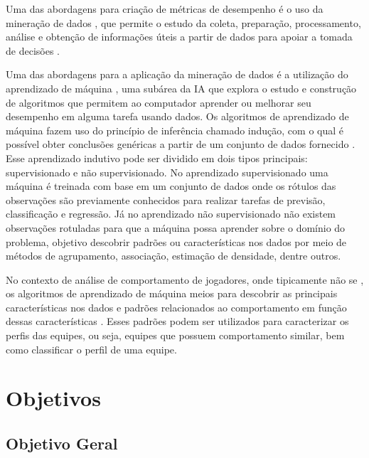 Uma das abordagens para  criação de métricas de desempenho é o uso da mineração de dados \cite{el2016game}, que permite o estudo da coleta, preparação, processamento, análise e obtenção de informações úteis a partir de dados para apoiar a tomada de decisões \cite{aggarwal2015data}.

Uma das abordagens para a aplicação da mineração de dados é a utilização do aprendizado de máquina \cite{aggarwal2015data}, uma subárea da IA que explora o estudo e construção de algoritmos que permitem ao computador aprender ou melhorar seu desempenho em alguma tarefa usando dados. Os algoritmos de aprendizado de máquina fazem uso do princípio de inferência chamado indução, com o qual é possível obter conclusões genéricas a partir de um conjunto de dados fornecido \cite{lorena2007introduccao}. Esse aprendizado indutivo pode ser dividido em dois tipos principais: supervisionado e não supervisionado. No aprendizado supervisionado uma máquina é treinada com base em um conjunto de dados onde os rótulos das observações são previamente conhecidos para realizar tarefas de previsão, classificação e regressão. Já no aprendizado não supervisionado não existem observações rotuladas para que a máquina possa aprender sobre o domínio do problema,  objetivo  descobrir padrões ou características nos dados \cite{sathya2013comparison} por meio de métodos de agrupamento, associação, estimação de densidade, dentre outros.

No contexto de análise de comportamento de jogadores, onde tipicamente não se , os algoritmos de aprendizado de máquina  meios para descobrir as principais características nos dados e padrões relacionados ao comportamento em função dessas características \cite{el2016game}. Esses padrões podem ser utilizados para caracterizar os perfis das equipes, ou seja, equipes que possuem comportamento similar, bem como classificar o perfil de uma equipe.

\section{Objetivos}

\subsection{Objetivo Geral}

